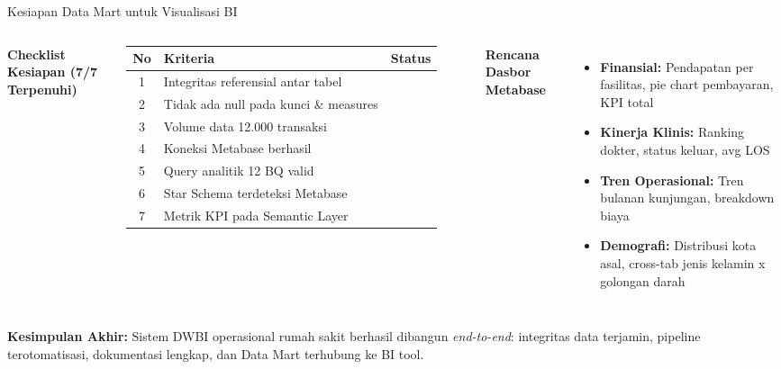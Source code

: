 \documentclass[xcolor=table,t,aspectratio=169]{beamer}
\newcommand{\tekshijau}[1]{{\color{green!60!black} #1}}
\begin{document}
\begin{frame}{Kesiapan Data Mart untuk Visualisasi BI}
  \footnotesize
  \begin{columns}[T]
    \textbf{Checklist Kesiapan (7/7 Terpenuhi)}
    \vspace{4pt}

    \scriptsize
    \begin{tabular}{@{}clc@{}}
      \toprule
      \textbf{No} & \textbf{Kriteria} & \textbf{Status} \\
      \midrule
      1 & Integritas referensial antar tabel    & \tekshijau{\checkmark} \\
      2 & Tidak ada null pada kunci \& measures & \tekshijau{\checkmark} \\
      3 & Volume data 12.000 transaksi          & \tekshijau{\checkmark} \\
      4 & Koneksi Metabase berhasil             & \tekshijau{\checkmark} \\
      5 & Query analitik 12 BQ valid            & \tekshijau{\checkmark} \\
      6 & Star Schema terdeteksi Metabase       & \tekshijau{\checkmark} \\
      7 & Metrik KPI pada Semantic Layer        & \tekshijau{\checkmark} \\
      \bottomrule
    \end{tabular}

    \textbf{Rencana Dasbor Metabase}
    \begin{itemize}
      \scriptsize
      \item \textbf{Finansial:} Pendapatan per fasilitas, pie chart pembayaran, KPI total
      \item \textbf{Kinerja Klinis:} Ranking dokter, status keluar, avg LOS
      \item \textbf{Tren Operasional:} Tren bulanan kunjungan, breakdown biaya
      \item \textbf{Demografi:} Distribusi kota asal, cross-tab jenis kelamin x golongan darah
    \end{itemize}
  \end{columns}

  \vspace{4pt}
  \begin{tcolorbox}[
    colback=ugmblue!8, colframe=ugmblue,
    leftrule=4pt, toprule=0.4pt, bottomrule=0.4pt, rightrule=0.4pt,
    top=3pt, bottom=3pt, left=6pt, right=6pt
  ]
    \scriptsize\textbf{Kesimpulan Akhir:} Sistem DWBI operasional rumah sakit berhasil dibangun \textit{end-to-end}: integritas data terjamin, pipeline terotomatisasi, dokumentasi lengkap, dan Data Mart terhubung ke BI tool.
  \end{tcolorbox}
\end{frame}
\end{document}
